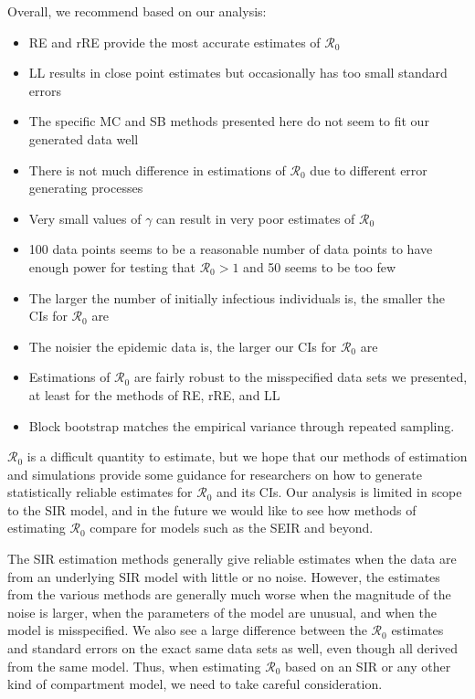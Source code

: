 \documentclass[12pt]{article}
\newcommand{\rr}{\ensuremath{\mathcal{R}_0}}
\begin{document}
Overall, we recommend based on our analysis:
\begin{itemize}
  \item RE and rRE provide the most accurate estimates of $\rr$
  \item LL results in close point estimates but occasionally has too small standard errors
  \item The specific MC and SB methods presented here do not seem to fit our generated data well
  \item There is not much difference in estimations of $\rr$ due to different error generating processes
  \item Very small values of $\gamma$ can result in very poor estimates of $\rr$
  \item 100 data points seems to be a reasonable number of data points to have enough power for testing that $\rr > 1$ and 50 seems to be too few
  \item The larger the number of initially infectious individuals is, the smaller the CIs for $\rr$ are
  \item The noisier the epidemic data is, the larger our CIs for $\rr$ are
  \item Estimations of $\rr$ are fairly robust to the misspecified data sets we presented, at least for the methods of RE, rRE, and LL
  \item Block bootstrap matches the empirical variance through repeated sampling.
  \end{itemize}

$\rr$ is a difficult quantity to estimate, but we hope that our methods of estimation and simulations provide some guidance for researchers on how to generate statistically reliable estimates for $\rr$ and its CIs.  Our analysis is limited in scope to the SIR model, and in the future we would like to see how methods of estimating $\rr$ compare for models such as the SEIR and beyond.






The SIR estimation methods generally give reliable estimates when the data are from an underlying SIR model with little or no noise. However, the estimates from the various methods are generally much worse when the magnitude of the noise is larger, when the parameters of the model are unusual, and when the model is misspecified. We also see a large difference between the $\rr$ estimates and standard errors on the exact same data sets as well, even though all derived from the same model. Thus, when estimating $\rr$ based on an SIR or any other kind of compartment model, we need to take careful consideration.


\pagebreak




\appendix
\end{document}
